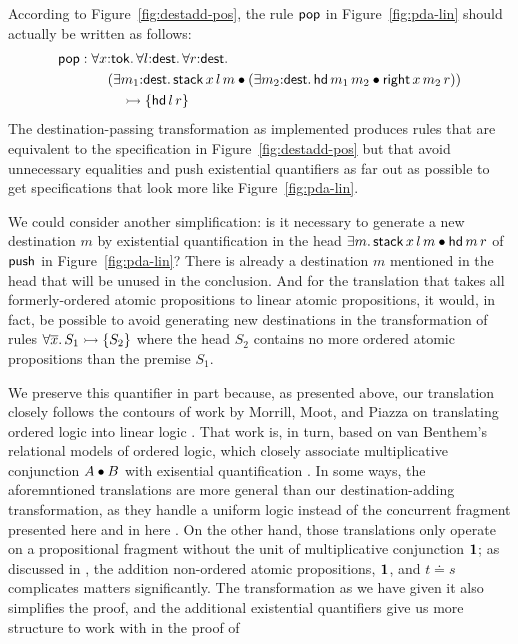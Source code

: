 According to Figure~\ref{fig:destadd-pos}, the rule 
${\sf pop}$ in Figure~\ref{fig:pda-lin} should actually be written as
follows:
\begin{align*} 
  {\sf pop} & : 
  \forall x{:}{\sf tok}.\,
  \forall l{:}{\sf dest}.\,
  \forall r{:}{\sf dest}.\,
  \\
  & \qquad (\exists m_1{:}{\sf dest}.\, {\sf stack}\,x\,l\,m \mathbin{\bullet}
   (\exists m_2{:}{\sf dest}.\, {\sf hd}\,m_1\,m_2 \mathbin{\bullet}
     {\sf right}\,x\,m_2\,r))
  \\ 
  & \qquad\quad \rightarrowtail
  \{ 
    {\sf hd}\,l\,r
  \}
\end{align*}
The destination-passing transformation as
implemented produces rules that are
equivalent to the specification in Figure~\ref{fig:destadd-pos}
but that avoid unnecessary equalities and push existential quantifiers
as far out as possible to get specifications that look more like
Figure~\ref{fig:pda-lin}. 

We could consider another simplification: is it necessary to generate
a new destination $m$ by existential quantification in the head
$\exists m.\,{\sf stack}\,x\,l\,m \mathbin{\bullet} {\sf hd}\,m\,r$ of ${\sf
  push}$ in Figure~\ref{fig:pda-lin}? There is already a destination
$m$ mentioned in the head that will be unused in the conclusion.  And
for the translation that takes all formerly-ordered atomic
propositions to linear atomic propositions, it would, in fact, be
possible to avoid generating new destinations in the transformation of
rules $\forall \overline{x}.\,S_1 \rightarrowtail \{ S_2 \}$ where the head
$S_2$ contains no more ordered atomic propositions than the premise
$S_1$. 

We preserve this quantifier in part because, as presented above, our
translation closely follows the contours of work by Morrill, Moot, and
Piazza on translating ordered logic into linear logic
\cite{morrill95higher,moot01linguistic}. That work is, in turn, based
on van Benthem's relational models of ordered logic, which closely
associate multiplicative conjunction $A \mathbin{\bullet} B$ with exisential
quantification \cite{vanbenthem91relational}. In some ways, the
aforemntioned translations are more general than our
destination-adding transformation, as they handle a uniform logic
instead of the concurrent fragment presented here and in here
\cite{simmons11logical}. On the other hand, those translations only
operate on a propositional fragment without the unit of multiplicative
conjunction $\mathbf{1}$; as discussed in \cite[p.~57]{simmons11logical},
the addition non-ordered atomic propositions, $\mathbf{1}$, and $t \doteq s$
complicates matters significantly. The transformation as we have given
it also simplifies the proof, and the additional existential quantifiers
give us more structure to work with in the proof of 

